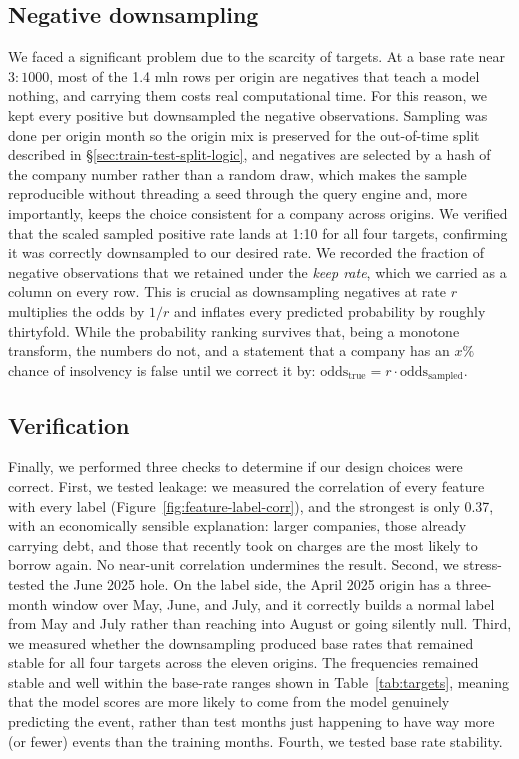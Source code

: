 \documentclass[    author={Samuel Menon Demelo; Sneha Saphala Ram Prasad; 
Viktor Ander Lindholm; Vishal Khatri},
               supervisor={Prof. Fernando Moreno-Pino},
                   degree={MSc},
                    title={Lloyds Commercial Banking Intelligence},
                 subtitle={Ranking SME Lending, Risk and Growth Prospects for Lloyds Banking Group},
                     type={},
                     year={2026}]{dissertation}
\begin{document}
\subsection{Negative downsampling}
We faced a significant problem due to the scarcity of targets. At a base rate near $3:1000$, most of the 1.4 mln rows per origin are negatives that teach a model nothing, and carrying them costs real computational time. For this reason, we kept every positive but downsampled the negative observations. Sampling was done per origin month so the origin mix is preserved for the out-of-time split described in \S\ref{sec:train-test-split-logic}, and negatives are selected by a hash of the company number rather than a random draw, which makes the sample reproducible without threading a seed through the query engine and, more importantly, keeps the choice consistent for a company across origins. We verified that the scaled sampled positive rate lands at 1:10 for all four targets, confirming it was correctly downsampled to our desired rate. We recorded the fraction of negative observations that we retained under the \textit{keep rate}, which we carried as a column on every row. This is crucial as downsampling negatives at rate $r$ multiplies the odds by $1/r$ and inflates every predicted probability by roughly thirtyfold. While the probability ranking survives that, being a monotone transform, the numbers do not, and a statement that a company has an $x\%$ chance of insolvency is false until we correct it by:
$\text{odds}_{\text{true}} = r \cdot \text{odds}_{\text{sampled}}$.

\subsection{Verification}
Finally, we performed three checks to determine if our design choices were correct. First, we tested leakage: we measured the correlation of every feature with every label (Figure~\ref{fig:feature-label-corr}), and the strongest is only 0.37, with an economically sensible explanation: larger companies, those already carrying debt, and those that recently took on charges are the most likely to borrow again. No near-unit correlation undermines the result. Second, we stress-tested the June 2025 hole. On the label side, the April 2025 origin has a three-month window over May, June, and July, and it correctly builds a normal label from May and July rather than reaching into August or going silently null. Third, we measured whether the downsampling produced base rates that remained stable for all four targets across the eleven origins. The frequencies remained stable and well within the base-rate ranges shown in Table~\ref{tab:targets}, meaning that the model scores are more likely to come from the model genuinely predicting the event, rather than test months just happening to have way more (or fewer) events than the training months. Fourth, we tested base rate stability.
\end{document}
